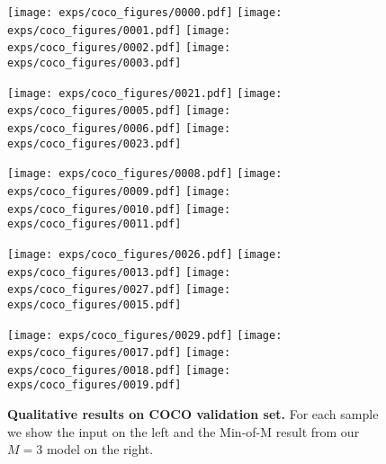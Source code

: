 \begin{figure*}[h!]
    \centering

    \texttt{[image: exps/coco\_figures/0000.pdf]}
    \texttt{[image: exps/coco\_figures/0001.pdf]}
    \texttt{[image: exps/coco\_figures/0002.pdf]}
    \texttt{[image: exps/coco\_figures/0003.pdf]}
    
    \texttt{[image: exps/coco\_figures/0021.pdf]}
    \texttt{[image: exps/coco\_figures/0005.pdf]}
    \texttt{[image: exps/coco\_figures/0006.pdf]}
    \texttt{[image: exps/coco\_figures/0023.pdf]}
    
    \texttt{[image: exps/coco\_figures/0008.pdf]}
    \texttt{[image: exps/coco\_figures/0009.pdf]}
    \texttt{[image: exps/coco\_figures/0010.pdf]}
    \texttt{[image: exps/coco\_figures/0011.pdf]}
    
    \texttt{[image: exps/coco\_figures/0026.pdf]}
    \texttt{[image: exps/coco\_figures/0013.pdf]}
    \texttt{[image: exps/coco\_figures/0027.pdf]}
    \texttt{[image: exps/coco\_figures/0015.pdf]}
    
    \texttt{[image: exps/coco\_figures/0029.pdf]}
    \texttt{[image: exps/coco\_figures/0017.pdf]}
    \texttt{[image: exps/coco\_figures/0018.pdf]}
    \texttt{[image: exps/coco\_figures/0019.pdf]}

    \caption{%
    \textbf{Qualitative results on COCO validation set.} 
    For each sample we show the input on the left and the Min-of-M result from our $M=3$ model on the right.
    }\label{fig:coco_unamb}
\end{figure*}